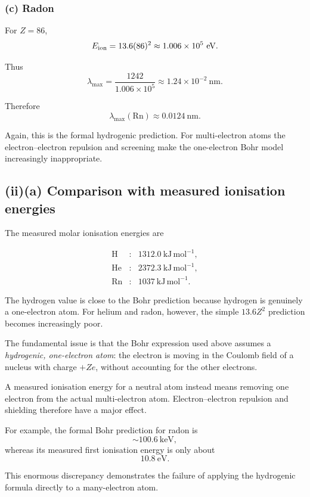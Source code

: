 \documentclass[11pt,a4paper]{article}
\begin{document}
\subsubsection*{(c) Radon}

For $Z=86$,
\[
E_{\rm ion}
=
13.6(86)^2
\approx1.006\times10^5\ \mathrm{eV}.
\]

Thus
\[
\lambda_{\max}
=
\frac{1242}{1.006\times10^5}
\approx1.24\times10^{-2}\ \mathrm{nm}.
\]

Therefore
\[
\boxed{\lambda_{\max}(\mathrm{Rn})\approx0.0124\ \mathrm{nm}}.
\]

Again, this is the formal hydrogenic prediction. For multi-electron atoms the
electron--electron repulsion and screening make the one-electron Bohr model
increasingly inappropriate.

\subsection{(ii)(a) Comparison with measured ionisation energies}

The measured molar ionisation energies are

\[
\begin{array}{lll}
\mathrm H &: &1312.0\ \mathrm{kJ\,mol^{-1}},\\
\mathrm{He}&: &2372.3\ \mathrm{kJ\,mol^{-1}},\\
\mathrm{Rn}&: &1037\ \mathrm{kJ\,mol^{-1}}.
\end{array}
\]

The hydrogen value is close to the Bohr prediction because hydrogen is genuinely
a one-electron atom. For helium and radon, however, the simple $13.6Z^2$ prediction
becomes increasingly poor.

The fundamental issue is that the Bohr expression used above assumes a
\emph{hydrogenic, one-electron atom}: the electron is moving in the Coulomb field of
a nucleus with charge $+Ze$, without accounting for the other electrons.

A measured ionisation energy for a neutral atom instead means removing one electron
from the actual multi-electron atom. Electron--electron repulsion and shielding
therefore have a major effect.

For example, the formal Bohr prediction for radon is
\[
\sim100.6\ \mathrm{keV},
\]
whereas its measured first ionisation energy is only about
\[
10.8\ \mathrm{eV}.
\]

This enormous discrepancy demonstrates the failure of applying the hydrogenic
formula directly to a many-electron atom.
\end{document}
